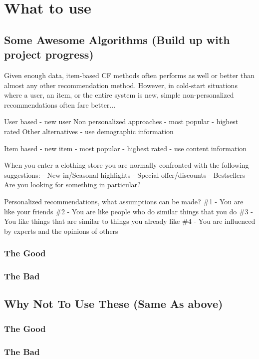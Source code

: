 
\section{What to use}


%
\subsection{Some Awesome Algorithms (Build up with project progress)}

Given enough data, item-based CF methods often performs as well or better than
almost any other recommendation method. However, in cold-start situations where
a user, an item, or the entire system is new, simple non-personalized
recommendations often fare better...

User based - new user
Non personalized approaches
    - most popular
    - highest rated
Other alternatives
    - use demographic information

Item based - new item
    - most popular
    - highest rated
    - use content information

When you enter a clothing store you are normally confronted with the following suggestions:
    - New in/Seasonal highlights
    - Special offer/discounts
    - Bestsellers
    - Are you looking for something in particular?

Personalized recommendations, what assumptions can be made?
\#1 - You are like your friends
\#2 - You are like people who do similar things that you do
\#3 - You like things that are similar to things you already like
\#4 - You are influenced by experts and the opinions of others

\subsubsection{The Good}
\subsubsection{The Bad}
\subsection{Why Not To Use These (Same As above)}
\subsubsection{The Good}
\subsubsection{The Bad}

